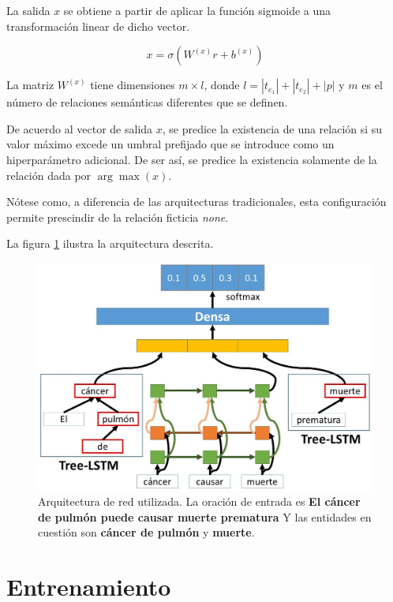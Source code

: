 La salida $x$ se obtiene a partir de aplicar la función sigmoide a una transformación linear de dicho vector.

\begin{equation*}
	x = \sigma(W^{(x)}r + b^{(x)})
\end{equation*}

La matriz $W^{(x)}$ tiene dimensiones $m \times l$, donde $l = |t_{e_1}| + |t_{e_2}| + |p|$ y $m$ es el número de relaciones semánticas diferentes que se definen.

De acuerdo al vector de salida $x$, se predice la existencia de una relación si su valor máximo excede un umbral prefijado que se introduce como un hiperparámetro adicional. De ser así, se predice la existencia solamente de la relación dada por $\arg\max(x)$.
	
Nótese como, a diferencia de las arquitecturas tradicionales, esta configuración permite prescindir de la relación ficticia \textit{none}.

La figura \ref{fig:rel_model} ilustra la arquitectura descrita.

\begin{figure}[h!]
	\centering
	\includegraphics[width=1\linewidth]{Graphics/rel_model_class.jpg}
	\caption{Arquitectura de red utilizada. La oración de entrada es \textbf{El cáncer de pulmón puede causar muerte prematura} Y las entidades en cuestión son \textbf{cáncer de pulmón} y \textbf{muerte}.}\label{fig:rel_model}
\end{figure}

\section{Entrenamiento}

